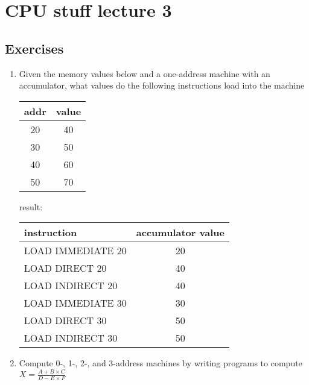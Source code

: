 \section*{CPU stuff lecture 3}
\subsection*{Exercises}
\begin{enumerate}
    \item Given the memory values below and a one-address machine with an accumulator, what values do the following instructions load into the machine
    \begin{table}[H]
        \centering
        \begin{tabular}{|c|c|}
            \hline
            addr & value \\\hline
            20 & 40 \\\hline
            30 & 50 \\\hline
            40 & 60 \\\hline
            50 & 70 \\\hline
        \end{tabular}
    \end{table}

    result:

    \begin{table}[H]
        \centering
        \begin{tabular}{|l|c|}
            \hline
            instruction & accumulator value \\\hline
            LOAD IMMEDIATE 20 & 20 \\\hline
            LOAD DIRECT 20 & 40 \\\hline
            LOAD INDIRECT 20 & 40 \\\hline
            LOAD IMMEDIATE 30 & 30 \\\hline
            LOAD DIRECT 30 & 50 \\\hline
            LOAD INDIRECT 30 & 50 \\\hline
        \end{tabular}
    \end{table}
    \item Compute 0-, 1-, 2-, and 3-address machines by writing programs to compute $X = \frac{A + B \times C}{D-E \times F}$
    
\end{enumerate}